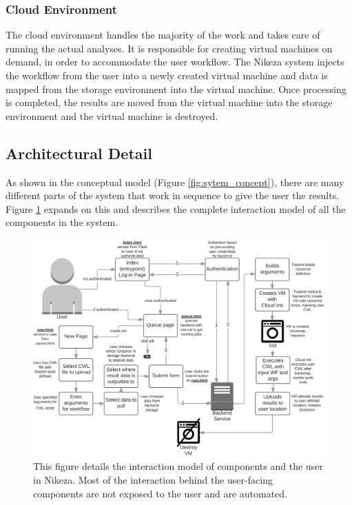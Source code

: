 \subsubsection{Cloud Environment}

The cloud environment handles the majority of the work and takes care of running the actual analyses. It is responsible for creating virtual machines on demand, in order to accommodate the user workflow. The Nikeza system injects the workflow from the user into a newly created virtual machine and data is mapped from the storage environment into the virtual machine. Once processing is completed, the results are moved from the virtual machine into the storage environment and the virtual machine is destroyed.

\subsection{Architectural Detail}

As shown in the conceptual model (Figure \ref{fig:sytem_concept}), there are many different parts of the system that work in sequence to give the user the results. Figure \ref{fig:system_detail} expands on this and describes the complete interaction model of all the components in the system.

\begin{figure}[ht!]
\centering
\includegraphics[width=\textwidth]{Figures/2_detailed_model.png}
\decoRule
\caption[Detailed Nikeza System Model]{This figure details the interaction model of components and the user in Nikeza. Most of the interaction behind the user-facing components are not exposed to the user and are automated.}
\label{fig:system_detail}
\end{figure}

